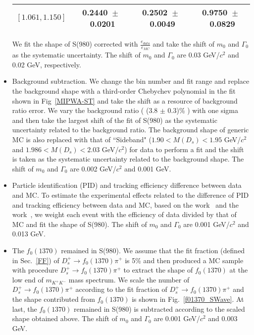 \documentclass[aps,prd,twocolumn,showpacs,amsmath,amssymb]{revtex4-1}
\begin{document}
\begin{itemize}
\begin{table*}[htbp]
\begin{center}
\begin{tabular}{cccc}
                        $[1.061, 1.150]$ &                0.2440\ $\pm$\ 0.0201 & 0.2502\ $\pm$\ 0.0049 & 0.9750\ $\pm$\ 0.0829 \\
                        \hline\hline
                    \end{tabular}
                \end{center}
            \end{table*}
            We fit the shape of S(980) corrected with $\frac{e_{data}}{e_{MC}}$ and take the shift of $m_{0}$ and $\Gamma_{0}$ as the systematic uncertainty. The shift of $m_{0}$ and $\Gamma_{0}$ are 0.03 GeV/$c^{2}$ and 0.02 GeV, respectively.

        \item \uppercase\expandafter{} Background subtraction. 
            We change the bin number and fit range and replace the background shape with a third-order Chebychev polynomial in the fit shown in Fig~\ref{MIPWA-ST} and take the shift as a resource of background ratio error.
            We vary the background ratio ( (3.8 $\pm$ 0.3)\% ) with one sigma and then take the largest shift of the fit of S(980) as the systematic uncertainty related to the background ratio. 
            The background shape of generic MC is also replaced with that of ``Sideband" ($1.90 < M(D_{s}) < 1.95$ GeV/$c^{2}$ and $1.986 < M(D_{s}) < 2.03$ GeV/$c^{2}$) for data to perform a fit and the shift is taken as the systematic uncertainty related to the background shape.
            The shift of $m_{0}$ and $\Gamma_{0}$ are 0.002 GeV/$c^{2}$ and 0.001 GeV.

        \item \uppercase\expandafter{} Particle identification (PID) and tracking efficiency difference between data and MC. 
            To estimate the experimental effects related to the difference of PID and tracking efficiency between data and MC, based on the work~\cite{PID} and the work~\cite{Tracking}, we weight each event with the efficiency of data divided by that of MC and fit the shape of S(980).
            The shift of $m_{0}$ and $\Gamma_{0}$ are 0.001 GeV/$c^{2}$ and 0.013 GeV.

        \item \uppercase\expandafter{} The $f_{0}(1370)$ remained in S(980). 
            We assume that the fit fraction (defined in Sec.~\ref{FF}) of $D_{s}^{+} \rightarrow f_{0}(1370)\pi^{+}$ is 5\% and then produced a MC sample with procedure $D_{s}^{+} \rightarrow f_{0}(1370)\pi^{+}$ to extract the shape of $f_{0}(1370)$ at the low end of $m_{K^{+}K^{-}}$ mass spectrum.
            We scale the number of $D_{s}^{+} \rightarrow f_{0}(1370)\pi^{+}$ according to the fit fraction of $D_{s}^{+} \rightarrow f_{0}(1370)\pi^{+}$ and the shape contributed from $f_{0}(1370)$ is shown in Fig.~\ref{f01370_SWave}.
            At last, the $f_{0}(1370)$ remained in S(980) is subtracted according to the scaled shape obtained above.
            The shift of $m_{0}$ and $\Gamma_{0}$ are 0.001 GeV/$c^{2}$ and 0.003 GeV.


\end{itemize}
\end{document}
